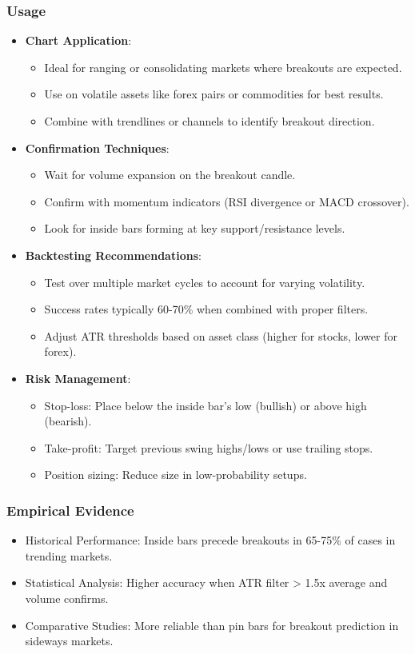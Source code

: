 \documentclass[12pt]{article}
\begin{document}
\subsubsection{Usage}
\begin{itemize}
\item \textbf{Chart Application}:
  \begin{itemize}
  \item Ideal for ranging or consolidating markets where breakouts are expected.
  \item Use on volatile assets like forex pairs or commodities for best results.
  \item Combine with trendlines or channels to identify breakout direction.
  \end{itemize}
\item \textbf{Confirmation Techniques}:
  \begin{itemize}
  \item Wait for volume expansion on the breakout candle.
  \item Confirm with momentum indicators (RSI divergence or MACD crossover).
  \item Look for inside bars forming at key support/resistance levels.
  \end{itemize}
\item \textbf{Backtesting Recommendations}:
  \begin{itemize}
  \item Test over multiple market cycles to account for varying volatility.
  \item Success rates typically 60-70\% when combined with proper filters.
  \item Adjust ATR thresholds based on asset class (higher for stocks, lower for forex).
  \end{itemize}
\item \textbf{Risk Management}:
  \begin{itemize}
  \item Stop-loss: Place below the inside bar's low (bullish) or above high (bearish).
  \item Take-profit: Target previous swing highs/lows or use trailing stops.
  \item Position sizing: Reduce size in low-probability setups.
  \end{itemize}
\end{itemize}

\subsubsection{Empirical Evidence}
\begin{itemize}
\item Historical Performance: Inside bars precede breakouts in 65-75\% of cases in trending markets.
\item Statistical Analysis: Higher accuracy when ATR filter > 1.5x average and volume confirms.
\item Comparative Studies: More reliable than pin bars for breakout prediction in sideways markets.
\end{itemize}
\end{document}

